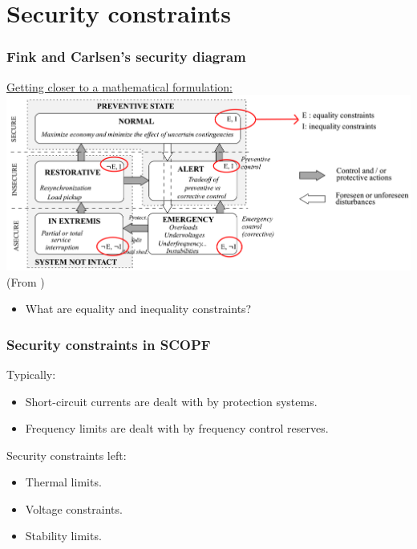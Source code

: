 \documentclass[compress]{beamer}
\newcommand*{\citec}[1]{(From \cite{#1})}
\begin{document}
\section{Security constraints}
\begin{frame}
\frametitle{Fink and Carlsen's security diagram}
\underline{Getting closer to a mathematical formulation:}
\centering
\includegraphics[width=\textwidth]{Figs/FinkCarlsen_SecurityDiagram_Highlight.png}\\
\citec{Fink1978Operating}
\begin{itemize}
\item What are equality and inequality constraints?
\end{itemize}
\end{frame}

\begin{frame}
\frametitle{Security constraints in SCOPF}
\begin{block}{}
\end{block}

Typically:
\begin{itemize}
\item Short-circuit currents are dealt with by protection systems.
\item Frequency limits are dealt with by frequency control reserves.
\end{itemize}
Security constraints left:
\begin{itemize}
\item Thermal limits.
\item Voltage constraints.
\item Stability limits.
\end{itemize}  
\end{frame}
\end{document}
